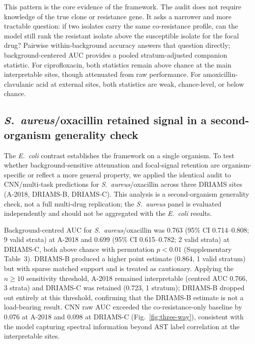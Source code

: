 \documentclass[11pt]{article}
\begin{document}


This pattern is the core evidence of the framework. The audit does not require knowledge of the true clone or resistance gene. It asks a narrower and more tractable question: if two isolates carry the same co-resistance profile, can the model still rank the resistant isolate above the susceptible isolate for the focal drug? Pairwise within-background accuracy answers that question directly; background-centered AUC provides a pooled stratum-adjusted companion statistic. For ciprofloxacin, both statistics remain above chance at the main interpretable sites, though attenuated from raw performance. For amoxicillin-clavulanic acid at external sites, both statistics are weak, chance-level, or below chance.

\subsection*{\textit{S.~aureus}/oxacillin retained signal in a second-organism generality check}

The \textit{E.~coli} contrast establishes the framework on a single organism. To test whether background-sensitive attenuation and focal-signal retention are organism-specific or reflect a more general property, we applied the identical audit to CNN/multi-task predictions for \textit{S.~aureus}/oxacillin across three DRIAMS sites (A-2018, DRIAMS-B, DRIAMS-C). This analysis is a second-organism generality check, not a full multi-drug replication; the \textit{S.~aureus} panel is evaluated independently and should not be aggregated with the \textit{E.~coli} results.

Background-centred AUC for \textit{S.~aureus}/oxacillin was 0.763 (95\% CI 0.714--0.808; 9 valid strata) at A-2018 and 0.699 (95\% CI 0.615--0.782; 2 valid strata) at DRIAMS-C, both above chance with permutation $p < 0.01$ (Supplementary Table~3). DRIAMS-B produced a higher point estimate (0.864, 1 valid stratum) but with sparse matched support and is treated as cautionary. Applying the $n \geq 10$ sensitivity threshold, A-2018 remained interpretable (centred AUC 0.766, 3 strata) and DRIAMS-C was retained (0.723, 1 stratum); DRIAMS-B dropped out entirely at this threshold, confirming that the DRIAMS-B estimate is not a load-bearing result. CNN raw AUC exceeded the co-resistance-only baseline by 0.076 at A-2018 and 0.098 at DRIAMS-C (Fig.~\ref{fig:three-way}), consistent with the model capturing spectral information beyond AST label correlation at the interpretable sites.
\end{document}
